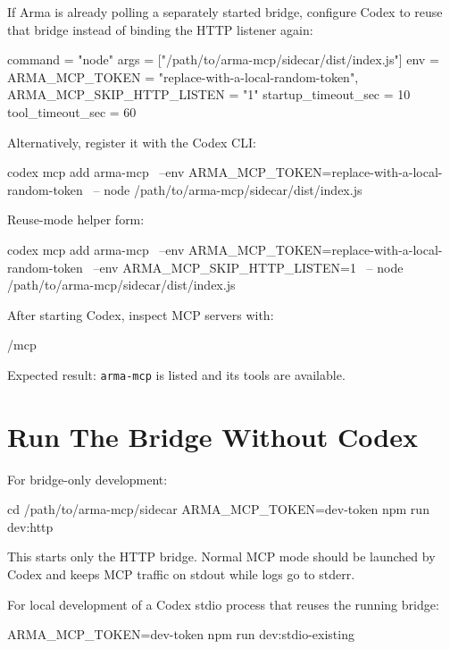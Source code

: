 \documentclass[11pt]{article}
\newcommand{\code}[1]{\texttt{#1}}
\begin{document}
If Arma is already polling a separately started bridge, configure Codex to reuse
that bridge instead of binding the HTTP listener again:

\begin{commandblock}
command = "node"
args = ["/path/to/arma-mcp/sidecar/dist/index.js"]
env = {
  ARMA_MCP_TOKEN = "replace-with-a-local-random-token",
  ARMA_MCP_SKIP_HTTP_LISTEN = "1"
}
startup_timeout_sec = 10
tool_timeout_sec = 60
\end{commandblock}

Alternatively, register it with the Codex CLI:

\begin{commandblock}
codex mcp add arma-mcp \
  --env ARMA_MCP_TOKEN=replace-with-a-local-random-token \
  -- node /path/to/arma-mcp/sidecar/dist/index.js
\end{commandblock}

Reuse-mode helper form:

\begin{commandblock}
codex mcp add arma-mcp \
  --env ARMA_MCP_TOKEN=replace-with-a-local-random-token \
  --env ARMA_MCP_SKIP_HTTP_LISTEN=1 \
  -- node /path/to/arma-mcp/sidecar/dist/index.js
\end{commandblock}

After starting Codex, inspect MCP servers with:

\begin{commandblock}
/mcp
\end{commandblock}

Expected result: \code{arma-mcp} is listed and its tools are available.

\section{Run The Bridge Without Codex}

For bridge-only development:

\begin{commandblock}
cd /path/to/arma-mcp/sidecar
ARMA_MCP_TOKEN=dev-token npm run dev:http
\end{commandblock}

This starts only the HTTP bridge. Normal MCP mode should be launched by Codex and
keeps MCP traffic on stdout while logs go to stderr.

For local development of a Codex stdio process that reuses the running bridge:

\begin{commandblock}
ARMA_MCP_TOKEN=dev-token npm run dev:stdio-existing
\end{commandblock}
\end{document}
